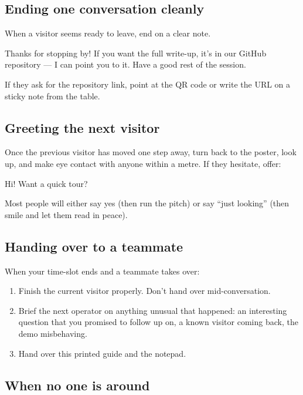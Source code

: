\documentclass[a4paper,11pt]{article}
\begin{document}
\subsection*{Ending one conversation cleanly}

When a visitor seems ready to leave, end on a clear note.

\begin{spoken}
Thanks for stopping by! If you want the full write-up, it's in
our GitHub repository --- I can point you to it. Have a good rest
of the session.
\end{spoken}

If they ask for the repository link, point at the QR code or
write the URL on a sticky note from the table.

\subsection*{Greeting the next visitor}

Once the previous visitor has moved one step away, turn back to
the poster, look up, and make eye contact with anyone within a
metre. If they hesitate, offer:

\begin{spoken}
Hi! Want a quick tour?
\end{spoken}

Most people will either say yes (then run the pitch) or say
``just looking'' (then smile and let them read in peace).

\subsection*{Handing over to a teammate}

When your time-slot ends and a teammate takes over:

\begin{enumerate}[leftmargin=*,nosep]
  \item Finish the current visitor properly. Don't hand over
        mid-conversation.
  \item Brief the next operator on anything unusual that
        happened: an interesting question that you promised to
        follow up on, a known visitor coming back, the demo
        misbehaving.
  \item Hand over this printed guide and the notepad.
\end{enumerate}

\subsection*{When no one is around}
\end{document}
